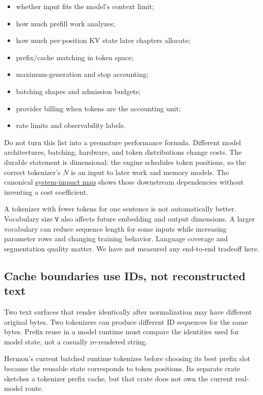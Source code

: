 \begin{itemize}
\tightlist
\item
  whether input fits the model's context limit;
\item
  how much prefill work  analyzes;
\item
  how much per-position KV state later chapters allocate;
\item
  prefix/cache matching in token space;
\item
  maximum-generation and stop accounting;
\item
  batching shapes and admission budgets;
\item
  provider billing when tokens are the accounting unit;
\item
  rate limits and observability labels.
\end{itemize}

Do not turn this list into a premature performance formula. Different
model architectures, batching, hardware, and token distributions change
costs. The durable statement is dimensional: the engine schedules token
positions, so the correct tokenizer's \(N\) is an input to later work
and memory models. The canonical
\href{https://github.com/hermonai/inside-the-llm-engine/blob/astra-visual-rewrite/diagrams/tokenizer/token-count-system-impact.txt}{system-impact
map} shows those downstream dependencies without inventing a cost
coefficient.

A tokenizer with fewer tokens for one sentence is not automatically
better. Vocabulary size \texttt{V} also affects future embedding and
output dimensions. A larger vocabulary can reduce sequence length for
some inputs while increasing parameter rows and changing training
behavior. Language coverage and segmentation quality matter. We have not
measured any end-to-end tradeoff here.

\subsection{Cache boundaries use IDs, not reconstructed
text}\label{cache-boundaries-use-ids-not-reconstructed-text}

Two text surfaces that render identically after normalization may have
different original bytes. Two tokenizers can produce different ID
sequences for the same bytes. Prefix reuse in a model runtime must
compare the identities used for model state, not a casually re-rendered
string.

Hermon's current batched runtime tokenizes before choosing its best
prefix slot because the reusable state corresponds to token positions.
Its separate \texttt{} crate sketches a
tokenizer prefix cache, but that crate does not own the current
real-model route.

